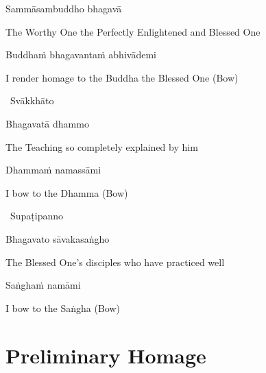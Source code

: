 \vspace{-0.5cm}

 Sammāsambuddho bhagavā

\begin{english}
  The Worthy One the Perfectly Enlightened and Blessed One
\end{english}

Buddhaṁ bhagavantaṁ abhivādemi\relax

\begin{english}
  I render homage to the Buddha the Blessed One \hfill{(Bow)}
\end{english}

\begin{leader}
 \anglebracketleft\ \hspace{-0.5mm}Svākkhāto \hspace{-0.5mm}\anglebracketright\
\end{leader}

\vspace{-0.5cm}

 Bhagavatā dhammo

\begin{english}
  The Teaching so completely explained by him
\end{english}

Dhammaṁ namassāmi\relax

\begin{english}
  I bow to the Dhamma \hfill{(Bow)}
\end{english}

\begin{leader}
  \anglebracketleft\ \hspace{-0.5mm}Supaṭipanno \hspace{-0.5mm}\anglebracketright\
\end{leader}

\vspace{-0.5cm}

 Bhagavato sāvakasaṅgho

\begin{english}
  The Blessed One's disciples who have practiced well
\end{english}

Saṅghaṁ namāmi

\begin{english}
  I bow to the Saṅgha \hfill{(Bow)}
\end{english}

\section{Preliminary Homage}
\label{preliminary-homage}

